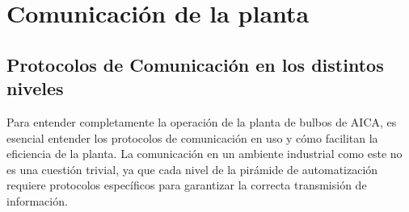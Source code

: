 \section{Comunicación de la planta}

\subsection{Protocolos de Comunicación en los distintos niveles}

Para entender completamente la operación de la planta de bulbos de AICA, es esencial entender los protocolos de comunicación
en uso y cómo facilitan la eficiencia de la planta. La comunicación en un ambiente industrial como este no es una cuestión
trivial, ya que cada nivel de la pirámide de automatización requiere protocolos específicos para garantizar la correcta
transmisión de información.

